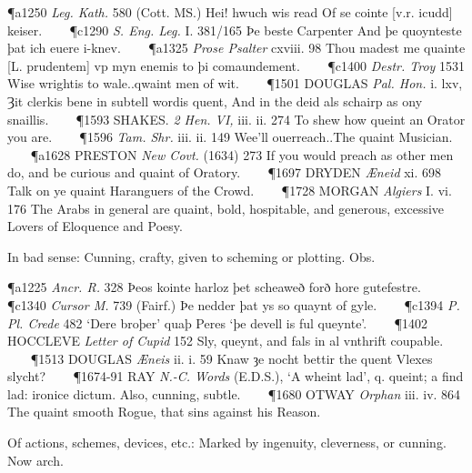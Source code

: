 \begin{description}[wide, labelwidth=!, labelindent=0pt]
\begin{myenumerate}
\P a1250  \textit{Leg. Kath.} 580 (Cott. MS.) Hei! hwuch wis read Of se cointe [v.r. icudd] keiser.    
\P c1290 \textit{S. Eng.  Leg.} I. 381/165 Þe beste Carpenter And þe quoynteste þat ich euere i-knev.    
\P a1325  \textit{Prose Psalter} cxviii. 98 Thou madest me quainte [L. prudentem] vp myn enemis to þi comaundement.    
\P c1400  \textit{Destr. Troy} 1531 Wise  wrightis to wale..qwaint men of wit.    
\P 1501 DOUGLAS  \textit{Pal. Hon.} i. lxv, Ȝit clerkis bene in subtell wordis quent, And in the deid als schairp as ony snaillis.    
\P 1593 SHAKES.  \textit{2 Hen. VI,} iii. ii. 274 To shew how queint an Orator you are.    
\P 1596   \textit{Tam. Shr.} iii. ii. 149 Wee'll ouerreach..The quaint Musician.    
\P a1628 PRESTON  \textit{New Covt.} (1634) 273 If you would preach as other men do, and be curious and quaint of Oratory.    
\P 1697 DRYDEN  \textit{Æneid} xi. 698 Talk on ye quaint Haranguers of the Crowd.    
\P 1728 MORGAN  \textit{Algiers} I. vi. 176 The Arabs in general are quaint, bold, hospitable, and generous, excessive Lovers of Eloquence and Poesy.

 In bad sense: Cunning, crafty, given to scheming or plotting. Obs.

\P a1225  \textit{Ancr. R.} 328 Þeos kointe harloz þet scheaweð forð hore gutefestre.    
\P c1340  \textit{Cursor M.} 739 (Fairf.) Þe nedder þat ys so quaynt of gyle.    
\P c1394 \textit{P. Pl.  Crede} 482 ‘Dere broþer’ quaþ Peres ‘þe devell is ful queynte’.    
\P 1402 HOCCLEVE  \textit{Letter of Cupid} 152 Sly, queynt, and fals in al vnthrift coupable.    
\P 1513 DOUGLAS  \textit{Æneis} ii. i. 59 Knaw ȝe nocht bettir the quent Vlexes slycht?    
\P 1674-91 RAY  \textit{N.-C. Words} (E.D.S.), ‘A wheint lad’, q. queint; a find lad: ironice dictum. Also, cunning, subtle.    
\P 1680 OTWAY  \textit{Orphan} iii. iv. 864 The quaint smooth Rogue, that sins against his Reason.

 Of actions, schemes, devices, etc.: Marked by ingenuity, cleverness, or cunning. Now arch.


\end{myenumerate}
\end{description}
